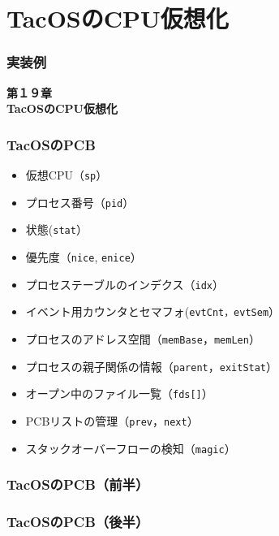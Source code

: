 \documentclass[unicode,handout]{beamer}                   %
\begin{document}
\section{TacOSのCPU仮想化}
\begin{frame}
  \frametitle{実装例}
  \vfill
  \begin{center}
    \textbf{\LARGE 第１９章} \\
    \textbf{\Huge TacOSのCPU仮想化}
  \end{center}
  \vfill
\end{frame}

\begin{frame}
  \frametitle{TacOSのPCB}
  \begin{itemize}
    \item 仮想CPU（\texttt{sp}）
    \item プロセス番号（\texttt{pid}）
    \item 状態(\texttt{stat}）
    \item 優先度（\texttt{nice}, \texttt{enice}）
    \item プロセステーブルのインデクス（\texttt{idx}）
    \item イベント用カウンタとセマフォ(\texttt{evtCnt，evtSem}）
    \item プロセスのアドレス空間（\texttt{memBase}，\texttt{memLen}）
    \item プロセスの親子関係の情報（\texttt{parent}，\texttt{exitStat}）
    \item オープン中のファイル一覧（\texttt{fds[]}）
    \item PCBリストの管理（\texttt{prev}，\texttt{next}）
    \item スタックオーバーフローの検知（\texttt{magic}）
  \end{itemize}
  \vfill
\end{frame}

\begin{frame}
  \frametitle{TacOSのPCB（前半）}
  \vspace{-5mm}
  \vfill
\end{frame}

\begin{frame}
  \frametitle{TacOSのPCB（後半）}
  \vfill
\end{frame}
\end{document}

